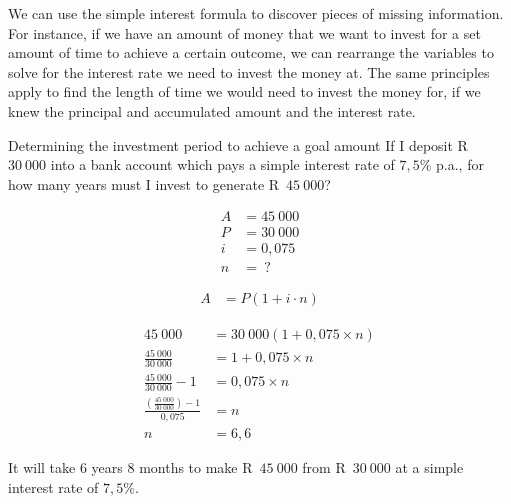 We can use the simple interest formula to discover pieces of missing information. For instance, if we have an amount of money that we want to invest for a set amount of time to achieve a certain outcome, we can rearrange the variables to solve for the interest rate we need to invest the money at. The same principles apply to find the length of time we would need to invest the money for, if we knew the principal and accumulated amount and the interest rate.


\begin{wex}{Determining the investment period to achieve a goal amount}{
    If I deposit R~$30~000$ into a bank account which pays a simple interest rate of $7,5\%$ p.a., for how many years must I invest to generate R~$45~000$?}{

    \begin{align*}
	A &= 45~000\\
	P &= 30~000\\
	i &= 0,075\\
	n &= ~?
    \end{align*}

    \begin{align*}
	A &= P(1 + i \cdot n)
    \end{align*}

    \begin{align*}
	45~000 &= 30~000(1 + 0,075 \times n)\\
	\frac{45~000}{30~000} &= 1 + 0,075 \times n\\
	\frac{45~000}{30~000} -1 &= 0,075 \times n\\
	\frac{(\frac{45~000}{30~000}) -1}{0,075} &= n\\
	n &= 6,6
    \end{align*}

    It will take 6 years 8 months to make R~$45~000$ from R~$30~000$ at a simple interest rate of $7,5\%$.
    }
\end{wex}




